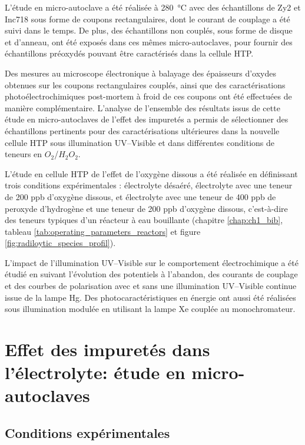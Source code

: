 \begin{refsection}
    L’étude en micro-autoclave a été réalisée à \SI{280}{\degreeCelsius} avec des échantillons de Zy2 et Inc718 sous forme de
    coupons rectangulaires, dont
    le courant de couplage a été suivi dans le temps. De plus, des échantillons non couplés, sous forme de disque et d’anneau, ont
    été exposés dans ces mêmes micro-autoclaves, pour fournir des échantillons préoxydés pouvant être caractérisés dans la cellule HTP.    
    
    Des mesures au microscope électronique à balayage des épaisseurs d’oxydes obtenues sur les coupons rectangulaires
    couplés, ainsi que des caractérisations photoélectrochimiques post-mortem à froid de ces coupons ont été effectuées
    de manière complémentaire. L’analyse de l’ensemble des résultats issus de cette étude en micro-autoclaves de l’effet
    des impuretés a permis de sélectionner des échantillons pertinents pour des caractérisations ultérieures dans la
    nouvelle cellule HTP sous illumination UV--Visible et dans différentes conditions de teneurs en $O_2$/$H_2O_2$.

    L’étude en cellule HTP de l’effet de l’oxygène dissous a été réalisée en définissant trois conditions 
    expérimentales : électrolyte désaéré, électrolyte avec une teneur de 200 ppb d’oxygène dissous, et électrolyte
    avec une teneur de 400 ppb de peroxyde d’hydrogène et une teneur de 200 ppb d’oxygène dissous, c’est-à-dire 
    des teneurs typiques d’un réacteur à eau bouillante (chapitre \ref{chap:ch1_bib}, tableau \ref{tab:operating_parameters_reactors}
    et figure \ref{fig:radiloytic_species_profil}).

    L’impact de l’illumination UV--Visible sur le comportement électrochimique a été étudié en suivant l’évolution
    des potentiels à l’abandon, des courants de couplage et des courbes de polarisation avec et sans une illumination
    UV--Visible continue issue de la lampe Hg. 
    Des photocaractéristiques en énergie ont aussi été réalisées 
    sous illumination modulée en utilisant la lampe Xe couplée au monochromateur.
     

    \section{Effet des impuretés dans l’électrolyte: étude en micro-autoclaves}\label{sec:effect_impurities}

\subsection{Conditions expérimentales}\label{subsec:exp_cond_MA}
    

\end{refsection}
